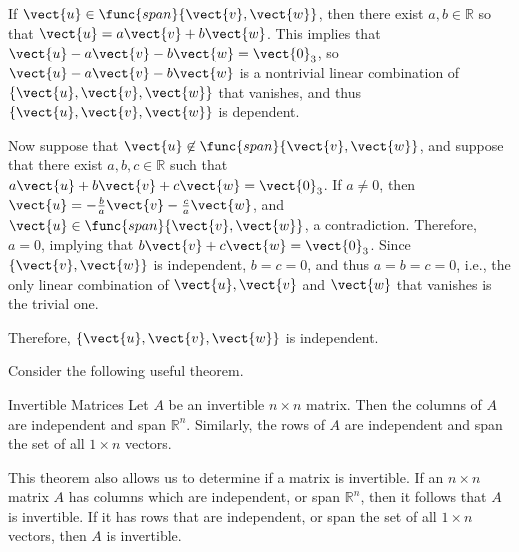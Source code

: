 \begin{solution}
If $\vect{u}\in\func{span}\{\vect{v},\vect{w}\}$, then there exist $a,b\in\mathbb{R}$ so
that $\vect{u}=a\vect{v} + b\vect{w}$.
This implies that $\vect{u}-a\vect{v} - b\vect{w}=\vect{0}_3$,
so  $\vect{u}-a\vect{v} - b\vect{w}$
is a nontrivial linear combination of $\{ \vect{u},\vect{v},\vect{w}\}$ that
vanishes, 
and thus $\{ \vect{u},\vect{v},\vect{w}\}$ is dependent.

Now suppose that $\vect{u}\not\in\func{span}\{\vect{v},\vect{w}\}$, and suppose
that there exist $a,b,c\in\mathbb{R}$ such that
$a\vect{u}+b\vect{v}+c\vect{w}=\vect{0}_3$.
If $a\neq 0$, then $\vect{u}=-\frac{b}{a}\vect{v}-\frac{c}{a}\vect{w}$,
and $\vect{u}\in\func{span}\{\vect{v},\vect{w}\}$, a contradiction.
Therefore, $a=0$, implying that $b\vect{v}+c\vect{w}=\vect{0}_3$.
Since $\{ \vect{v},\vect{w}\}$ is independent, $b=c=0$, and thus
$a=b=c=0$, i.e., the only linear combination of 
$\vect{u},\vect{v}$ and $\vect{w}$ that vanishes is the trivial one.

Therefore, $\{ \vect{u},\vect{v},\vect{w}\}$ is independent.
\end{solution}

Consider the following useful theorem.

\begin{theorem}{Invertible Matrices}\label{thm:invertiblematrices}
Let $A$ be an invertible $n \times n$ matrix. Then the columns of $A$ are independent and span $\mathbb{R}^n$. Similarly, the rows of $A$ are independent and span the set of all $1 \times n$ vectors. 
\end{theorem}

This theorem also allows us to determine if a matrix is invertible. If an $n \times n$ matrix $A$ has columns which are independent, or span $\mathbb{R}^n$, then it follows that $A$ is invertible. If it has rows that are independent, or span the set of all $1 \times n$ vectors, then $A$ is invertible.